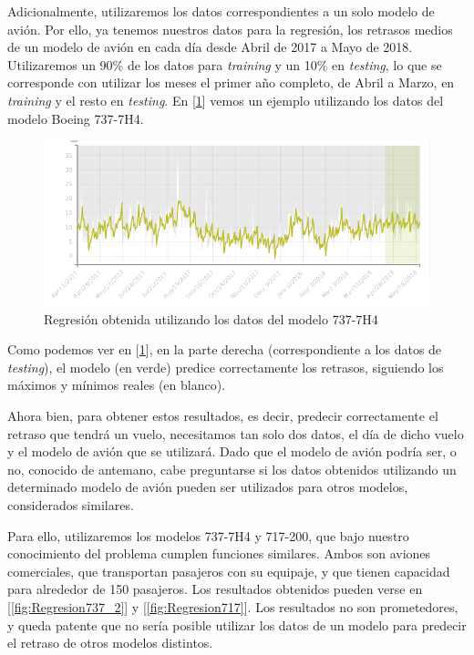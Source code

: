 \documentclass[format=acmsmall, review=false, screen=true]{acmart}
\begin{document}
Adicionalmente, utilizaremos los datos correspondientes a un solo modelo de avión. Por ello, ya tenemos nuestros datos para la regresión, los retrasos medios de un modelo de avión en cada día desde Abril de 2017 a Mayo de 2018. Utilizaremos un 90\% de los datos para \emph{training} y un 10\% en \emph{testing}, lo que se corresponde con utilizar los meses el primer año completo, de Abril a Marzo, en \emph{training} y el resto en \emph{testing}. En [\ref{fig:Regresion737}] vemos un ejemplo utilizando los datos del modelo Boeing 737-7H4.

\begin{figure}[htb]
	\centering
	\includegraphics[width=14cm]{Regresion-737.png}
	\caption{Regresión obtenida utilizando los datos del modelo 737-7H4}
	\label{fig:Regresion737}
\end{figure}

Como podemos ver en [\ref{fig:Regresion737}], en la parte derecha (correspondiente a los datos de \emph{testing}), el modelo (en verde) predice correctamente los retrasos, siguiendo los máximos y mínimos reales (en blanco).

Ahora bien, para obtener estos resultados, es decir, predecir correctamente el retraso que tendrá un vuelo, necesitamos tan solo dos datos, el día de dicho vuelo y el modelo de avión que se utilizará. Dado que el modelo de avión podría ser, o no, conocido de antemano, cabe preguntarse si los datos obtenidos utilizando un determinado modelo de avión pueden ser utilizados para otros modelos, considerados similares.

Para ello, utilizaremos los modelos 737-7H4 y 717-200, que bajo nuestro conocimiento del problema cumplen funciones similares. Ambos son aviones comerciales, que transportan pasajeros con su equipaje, y que tienen capacidad para alrededor de 150 pasajeros. Los resultados obtenidos pueden verse en [\ref{fig:Regresion737_2}] y [\ref{fig:Regresion717}]. Los resultados no son prometedores, y queda patente que no sería posible utilizar los datos de un modelo para predecir el retraso de otros modelos distintos.
\end{document}
